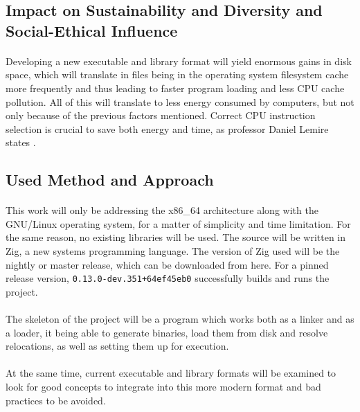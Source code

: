 \documentclass[12pt]{article}
\begin{document}
	\subsection{Impact on Sustainability and Diversity and Social-Ethical Influence}
    \paragraph{} Developing a new executable and library format will yield enormous gains in disk space, which will translate in files being in the operating system filesystem cache more frequently and thus leading to faster program loading and less CPU cache pollution. All of this will translate to less energy consumed by computers, but not only because of the previous factors mentioned. Correct CPU instruction selection is crucial to save both energy and time, as professor Daniel Lemire states \cite{lemire-energy}. 
	\subsection{Used Method and Approach}
	\paragraph{}This work will only be addressing the x86\_64 architecture along with the \acrshort{GNU}/Linux operating system, for a matter of simplicity and time limitation. For the same reason, no existing libraries will be used. The source will be written in Zig\cite{zig}, a new systems programming language. The version of Zig used will be the nightly or master release, which can be downloaded from here\cite{zig-download}. For a pinned release version, \verb|0.13.0-dev.351+64ef45eb0| successfully builds and runs the project.
    
    \paragraph{}The skeleton of the project will be a program which works both as a linker and as a loader, it being able to generate binaries, load them from disk and resolve relocations, as well as setting them up for execution.
    
    \paragraph{}At the same time, current executable and library formats will be examined to look for good concepts to integrate into this more modern format and bad practices to be avoided.
    
\end{document}
